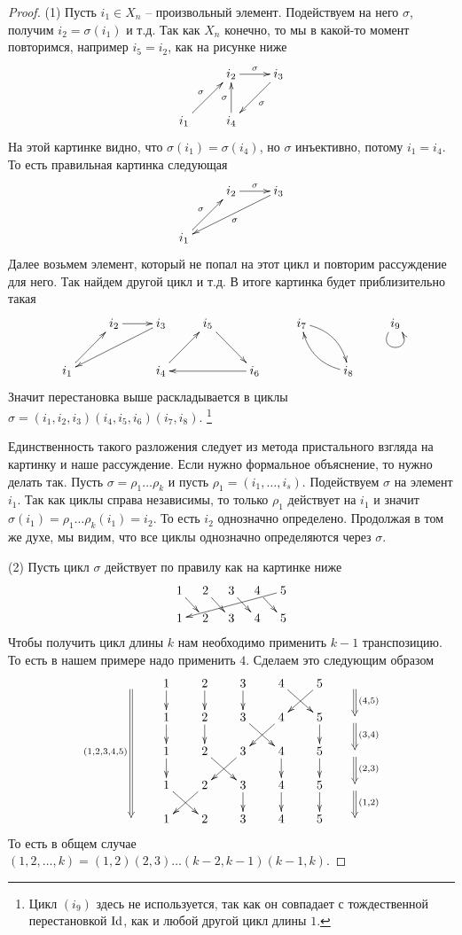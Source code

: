 \begin{proof}
(1) Пусть $i_1\in X_n$ -- произвольный элемент.
Подействуем на него $\sigma$, получим $i_2 = \sigma(i_1)$ и т.д.
Так как $X_n$ конечно, то мы в какой-то момент повторимся, например $i_5 = i_2$, как на рисунке ниже
\[
\xymatrix{
	{}&{i_2}\ar[r]^{\sigma}&{i_3}\ar[dl]^{\sigma}\\
	{i_1}\ar[ru]^{\sigma}&{i_4}\ar[u]^{\sigma}&{}\\
}
\]
На этой картинке видно, что $\sigma(i_1) = \sigma(i_4)$, но $\sigma$ инъективно, потому $i_1 = i_4$.
То есть правильная картинка следующая
\[
\xymatrix{
	{}&{i_2}\ar[r]^{\sigma}&{i_3}\ar[dll]^{\sigma}\\
	{i_1}\ar[ru]^{\sigma}&{}&{}\\
}
\]
Далее возьмем элемент, который не попал на этот цикл и повторим рассуждение для него.
Так найдем другой цикл и т.д.
В итоге картинка будет приблизительно такая
\[
\xymatrix{
	{}&{i_2}\ar[r]&{i_3}\ar[dll]&{i_5}\ar[rd]&{}&{i_7}\ar@/^10pt/[dr]&{}&{i_9}\ar@(dl,dr)\\
	{i_1}\ar[ru]&{}&{i_4}\ar[ru]&{}&{i_6}\ar[ll]&{}&{i_8}\ar@/^10pt/[ul]&{}\\
}
\]
Значит перестановка выше раскладывается в циклы $\sigma = (i_1,i_2,i_3) (i_4,i_5,i_6)(i_7,i_8)$.%
\footnote{Цикл $(i_9)$ здесь не используется, так как он совпадает с тождественной перестановкой $\operatorname{Id}$, как и любой другой цикл длины $1$.} 

Единственность такого разложения следует из метода пристального взгляда на картинку и наше рассуждение.
Если нужно формальное объяснение, то нужно делать так.
Пусть $\sigma = \rho_1\ldots \rho_k$ и пусть $\rho_1 = (i_1,\ldots,i_s)$.
Подействуем $\sigma$ на элемент $i_1$.
Так как циклы справа независимы, то только $\rho_1$ действует на $i_1$ и значит $\sigma(i_1)=\rho_1 \ldots \rho_k(i_1) = i_2$.
То есть $i_2$ однозначно определено.
Продолжая в том же духе, мы видим, что все циклы однозначно определяются через $\sigma$.

(2) Пусть цикл $\sigma$ действует по правилу как на картинке ниже
\[
\xymatrix@R=10pt@C=10pt{
  {1}\ar[dr]&{2}\ar[dr]&{3}\ar[dr]&{4}\ar[dr]&{5}\ar[dllll]\\
  {1}&{2}&{3}&{4}&{5}\\
}
\]
Чтобы получить цикл длины $k$ нам необходимо применить $k-1$ транспозицию.
То есть в нашем примере надо применить $4$.
Сделаем это следующим образом
\[
\xymatrix@R=15pt@C=20pt{
  {}\ar@{=>}_{(1,2,3,4,5)}[dddd]&{1}\ar[d]&{2}\ar[d]&{3}\ar[d]&{4}\ar[dr]&{5}\ar[dl]&{}\ar@{=>}[d]^{(4,5)}\\
  {}&{1}\ar[d]&{2}\ar[d]&{3}\ar[dr]&{4}\ar[dl]&{5}\ar[d]&{}\ar@{=>}[d]^{(3,4)}\\
  {}&{1}\ar[d]&{2}\ar[dr]&{3}\ar[dl]&{4}\ar[d]&{5}\ar[d]&{}\ar@{=>}[d]^{(2,3)}\\
  {}&{1}\ar[dr]&{2}\ar[dl]&{3}\ar[d]&{4}\ar[d]&{5}\ar[d]&{}\ar@{=>}[d]^{(1,2)}\\
  {}&{1}&{2}&{3}&{4}&{5}&{}\\
}
\]
То есть в общем случае $(1,2,\ldots,k) = (1,2)(2,3)\ldots(k-2,k-1)(k-1,k)$.
\end{proof}

